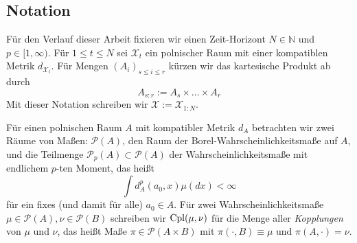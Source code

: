 \subsection{Notation}
Für den Verlauf dieser Arbeit fixieren wir einen Zeit-Horizont $N \in \mathbb{N}$ und $p \in [1,\infty)$. Für $1\leq t \leq N$ sei $\mathcal{X}_t$ ein polnischer Raum mit einer kompatiblen Metrik $d_{\mathcal{X}_t}$. Für Mengen $\left(A_{i}\right)_{s\leq i \leq r}$ kürzen wir das kartesische Produkt ab durch
$$A_{s:r} := A_s \times ... \times A_r$$
Mit dieser Notation schreiben wir $\mathcal{X}:=\mathcal{X}_{1:N}$.

Für einen polnischen Raum $A$ mit kompatibler Metrik $d_A$ betrachten wir zwei Räume von Maßen: $\mathcal{P}(A)$, den Raum der Borel-Wahrscheinlichkeitsmaße auf $A$, und die Teilmenge $\mathcal{P}_p(A) \subset \mathcal{P}(A)$ der Wahrscheinlichkeitsmaße mit endlichem $p$-ten Moment, das heißt
$$\int d_A^p(a_0, x) \mu(dx) < \infty$$
für ein fixes (und damit für alle) $a_0 \in A$. Für zwei Wahrscheinlichkeitsmaße $\mu \in \mathcal{P}(A), \nu \in \mathcal{P}(B)$ schreiben wir $\operatorname{Cpl}(\mu, \nu)$ für die Menge aller \emph{Kopplungen} von $\mu$ und $\nu$, das heißt Maße $\pi \in \mathcal{P}(A \times B)$ mit $\pi(\cdot, B)\equiv \mu$ und $\pi(A, \cdot)=\nu$.

